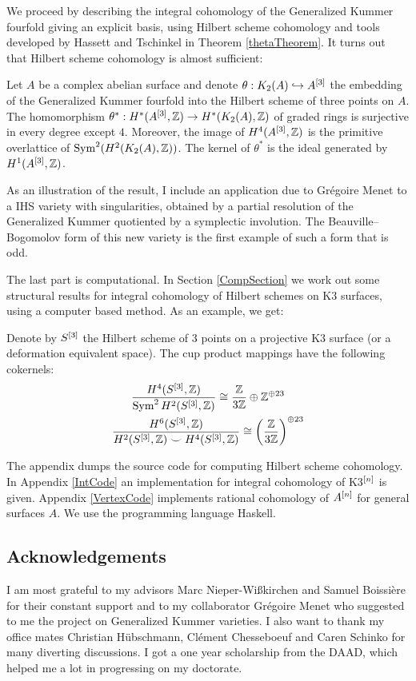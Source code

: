 We proceed by describing the integral cohomology of the Generalized Kummer fourfold giving an explicit basis, using Hilbert scheme cohomology and tools developed by Hassett and Tschinkel in Theorem \ref{thetaTheorem}. It turns out that Hilbert scheme cohomology is almost sufficient:
\begin{theorem}
Let $A$ be a complex abelian surface and denote $\theta: \kum{A}{2}\hookrightarrow A^{[3]}$ the embedding of the Generalized Kummer fourfold into the Hilbert scheme of three points on $A$.
The homomorphism $\theta^*:H^*(A\hilb{3},\Z)\rightarrow H^*(\kum{A}{2},\Z)$ of graded rings is surjective in every degree except $4$. Moreover, the image of $H^4(A\hilb{3},\Z)$ is the primitive overlattice of $\Sym^2(H^2(\kum{A}{2},\Z))$. 
The kernel of $\theta^*$ is the ideal generated by $H^1(A\hilb{3},\Z)$.
\end{theorem}
As an illustration of the result, I include an application due to Gr\'egoire Menet to a IHS variety with singularities, obtained by a partial resolution of the Generalized Kummer quotiented by a symplectic involution. The Beauville--Bogomolov form of this new variety is the first example of such a form that is odd.

The last part is computational. In Section \ref{CompSection} we work out some structural results for integral cohomology of Hilbert schemes on K3 surfaces, using a computer based method. As an example, we get:
\begin{theorem}
Denote by $S\hilb{3}$ the Hilbert scheme of 3 points on a projective K3 surface (or a deformation equivalent space).
The cup product mappings have the following cokernels:
\begin{gather}
\frac{H^4(S\hilb{3},\IZ)}{\Sym^2 H^2(S\hilb{3},\IZ)}  \cong \frac{\IZ}{3\IZ} \oplus \IZ^ {\oplus 23}\\
\frac{H^6(S\hilb{3},\IZ)}{H^2(S\hilb{3},\IZ)\smile H^4(S\hilb{3},\IZ)} \cong \left(\frac{\IZ}{3\IZ}\right)^{\oplus 23}
\end{gather}
\end{theorem}

The appendix dumps the source code for computing Hilbert scheme cohomology. In Appendix \ref{IntCode} an implementation for integral cohomology of K3$\hilb{n}$ is given. 
Appendix \ref{VertexCode} implements rational cohomology of $A\hilb{n}$ for general surfaces $A$. 
We use the programming language Haskell.


\subsection{Acknowledgements}
I am most grateful to my advisors Marc Nieper-Wi\ss kirchen and Samuel Boissi\`ere for their constant support
and to my collaborator Gr\'egoire Menet who suggested to me the project on Generalized Kummer varieties.
I also want to thank my office mates Christian H\"ubschmann, Cl\'ement Chesseboeuf and Caren Schinko for many diverting discussions.
I got a one year scholarship from the DAAD, which helped me a lot in progressing on my doctorate.
